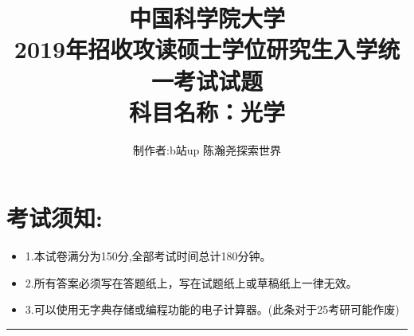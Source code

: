 \documentclass[11pt,a4paper]{article}
\begin{document}
    \title{中国科学院大学\\2019年招收攻读硕士学位研究生入学统一考试试题\\科目名称：光学}
    \author{制作者:b站up 陈瀚尧探索世界}
    \date{}
    \maketitle
    \titleformat{\section}[block]{\normalfont\Large\bfseries}{}{0pt}{}


    \section{考试须知:}
    \begin{itemize}[topsep=0pt,itemsep=0pt,partopsep=0pt]
        \item 1.本试卷满分为150分,全部考试时间总计180分钟。
        \vspace{-3mm}
        \item 2.所有答案必须写在答题纸上，写在试题纸上或草稿纸上一律无效。
        \vspace{-3mm}
        \item 3.可以使用无字典存储或编程功能的电子计算器。(此条对于25考研可能作废)
    \end{itemize}
    \vspace{-5mm}
    \noindent\rule{\textwidth}{0.5pt} %
    \vspace{-12mm}
\end{document}
